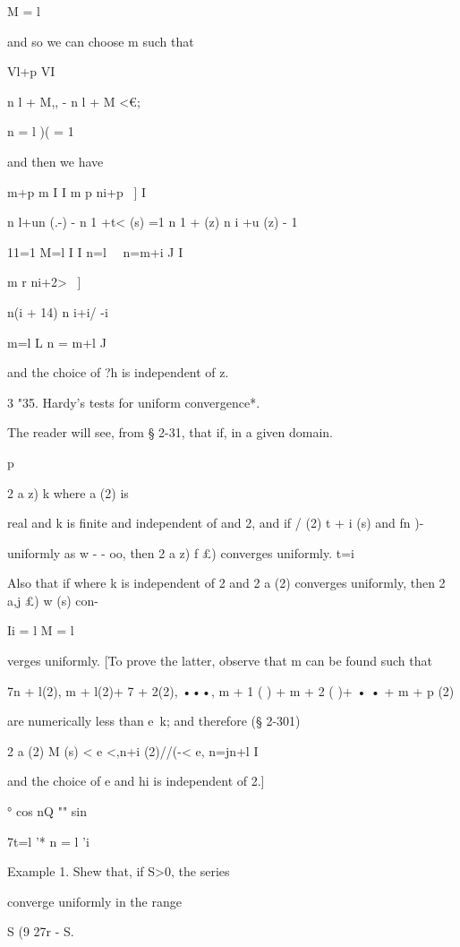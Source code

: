 M = l

and so we can choose m such that

Vl+p VI

n l + M,, - n l + M <€;

n = l )( = 1

and then we have

m+p m I I m p ni+p ~] I

n l+un (.-) - n 1 +t< (s) =1 n 1 + (z) n i +u (z) - 1

11=1 M=l I I n=l \ \ n=m+i J I

m r ni+2> ~]

 n(i + 14) n i+i/ -i

m=l L n = m+l J

and the choice of ?h is independent of z.

3 "35. Hardy's tests for uniform convergence*.



The reader will see, from § 2-31, that if, in a given domain.



p



2 a z) k where a (2) is



real and k is finite and independent of and 2, and if / (2) t + i (s)
and fn )-

uniformly as w - - oo, then 2 a z) f £) converges uniformly. t=i

Also that if where k is independent of 2 and 2 a (2) converges
uniformly, then 2 a,j £) w (s) con-

Ii = l M = l

verges uniformly. [To prove the latter, observe that m can be found
such that

 7n + l(2), m + l(2)+ 7 + 2(2), •••, m + 1 ( ) + m + 2 ( )+ • • + m +
p (2)

are numerically less than e\ k; and therefore (§ 2-301)

2 a (2) M (s) < e <,n+i (2)//(-< e, n=jn+l I

and the choice of e and hi is independent of 2.]



° cos nQ "" sin %

7t=l '* n = l 'i



Example 1. Shew that, if S>0, the series

converge uniformly in the range

S (9 27r - S.

